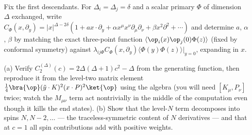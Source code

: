 \begin{exercise}[medium]
\label{exr:ope-descendants}
Fix the first descendants. For $\Delta_i = \Delta_j = \delta$ and a scalar
primary $\Phi$ of dimension $\Delta$ exchanged, write $C_\Phi(x, \partial_y) =
|x|^{\Delta - 2\delta}\left(1 + a x\cdot\partial_y + \alpha x^\mu x^\nu
\partial_\mu \partial_\nu + \beta x^2 \partial^2 + \cdots\right)$ and
determine $a$, $\alpha$, $\beta$ by matching the exact three-point function
$\langle\op_i(x)\op_j(0)\Phi(z)\rangle$ (fixed by conformal symmetry) against
$\lambda_{ij\Phi} C_\Phi(x,\partial_y)\langle \Phi(y)\Phi(z)\rangle|_{y=0}$,
expanding in $x$.
\end{exercise}

\begin{exercise}[classic]
\label{exr:gegenbauer}
(a) Verify $C^{(\Delta)}_2(c) = 2\Delta(\Delta+1)c^2 - \Delta$ from the
generating function, then reproduce it from the level-two matrix element
$\frac{1}{4}\bra{\op}(\tilde y \cdot K)^2 (x\cdot P)^2\ket{\op}$ using the
algebra (you will need $[K_\mu, P_\nu]$ twice; watch the $M_{\mu\nu}$ term
act nontrivially in the middle of the computation even though it kills the
end states). (b) Show that the level-$N$ term decomposes into spins $N, N-2,
\dots$ --- the traceless-symmetric content of $N$ derivatives --- and that at
$c=1$ all spin contributions add with positive weights.
\end{exercise}


